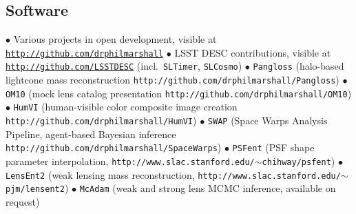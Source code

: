 \subsection*{Software}

$\bullet$
%
Various projects in open development, visible at
\href{http://github.com/drphilmarshall}{\texttt{http://github.com/drphilmarshall}}\newline
%
$\bullet$
%
LSST DESC contributions, visible at
\href{http://github.com/LSSTDESC}{\texttt{http://github.com/LSSTDESC}} (incl.\ \texttt{SLTimer}, \texttt{SLCosmo})\newline
%
$\bullet$
%
\texttt{Pangloss} (halo-based lightcone mass reconstruction
\texttt{http://github.com/drphilmarshall/Pangloss})\newline
%
$\bullet$
%
\texttt{OM10} (mock lens catalog presentation
\texttt{http://github.com/drphilmarshall/OM10})\newline
%
$\bullet$
%
\texttt{HumVI} (human-visible color composite image creation
\texttt{http://github.com/drphilmarshall/HumVI})\newline
%
$\bullet$
%
\texttt{SWAP} (Space Warps Analysis Pipeline, agent-based Bayesian inference
\texttt{http://github.com/drphilmarshall/SpaceWarps})\newline
%
%
%
$\bullet$
%
\texttt{PSFent} (PSF shape parameter interpolation,
\texttt{http://www.slac.stanford.edu/$\sim$chihway/psfent})\newline
%
%
$\bullet$
%
\texttt{LensEnt2} (weak lensing mass reconstruction,
\texttt{http://www.slac.stanford.edu/$\sim$pjm/lensent2})\newline
%
%
$\bullet$
%
\texttt{McAdam} (weak and strong lens MCMC inference, available on
request)\newline
